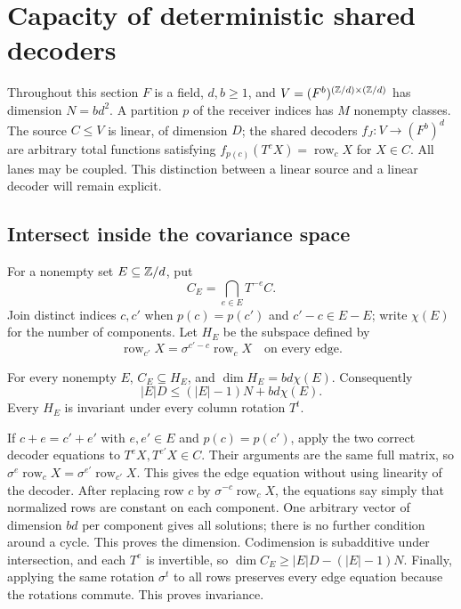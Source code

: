 \section{Capacity of deterministic shared decoders}\label{sec:capacity}

Throughout this section $F$ is a field, $d,b\ge1$, and
$V=(F^b)^{(\mathbb{Z}/d)\times(\mathbb{Z}/d)}$ has dimension $N=bd^2$.
A partition $p$ of the receiver indices has $M$ nonempty classes.
The source $C\le V$ is linear, of dimension $D$; the shared decoders
$f_J:V\to(F^b)^d$ are arbitrary total functions satisfying
$f_{p(c)}(T^cX)=\operatorname{row}_cX$ for $X\in C$.
All lanes may be coupled. This distinction between a linear source and a
linear decoder will remain explicit.

\subsection{Intersect inside the covariance space}

For a nonempty set $E\subseteq\mathbb{Z}/d$, put
\[
 C_E=\bigcap_{e\in E}T^{-e}C.
\]
Join distinct indices $c,c'$ when $p(c)=p(c')$ and $c'-c\in E-E$;
write $\chi(E)$ for the number of components. Let $H_E$ be the subspace
defined by
\[
 \operatorname{row}_{c'}X=\sigma^{c'-c}\operatorname{row}_cX
 \quad\text{on every edge}.
\]

\begin{lemma}\label{lem:deterministic-tp}
For every nonempty $E$, $C_E\subseteq H_E$, and
$\dim H_E=bd\chi(E)$. Consequently
\[
 |E|D\le (|E|-1)N+bd\chi(E).
\]
Every $H_E$ is invariant under every column rotation $T^t$.
\end{lemma}
\begin{outline}
If $c+e=c'+e'$ with $e,e'\in E$ and $p(c)=p(c')$, apply the two
correct decoder equations to $T^eX,T^{e'}X\in C$. Their arguments are
the same full matrix, so
$\sigma^e\operatorname{row}_cX=\sigma^{e'}\operatorname{row}_{c'}X$.
This gives the edge equation without using linearity of the decoder.
After replacing row $c$ by $\sigma^{-c}\operatorname{row}_cX$, the
equations say simply that normalized rows are constant on each component.
One arbitrary vector of dimension $bd$ per component gives all solutions;
there is no further condition around a cycle. This proves the dimension.
Codimension is subadditive under intersection, and each $T^e$ is invertible,
so $\dim C_E\ge |E|D-(|E|-1)N$. Finally, applying the same rotation
$\sigma^t$ to all rows preserves every edge equation because the rotations
commute. This proves invariance.
\end{outline}

